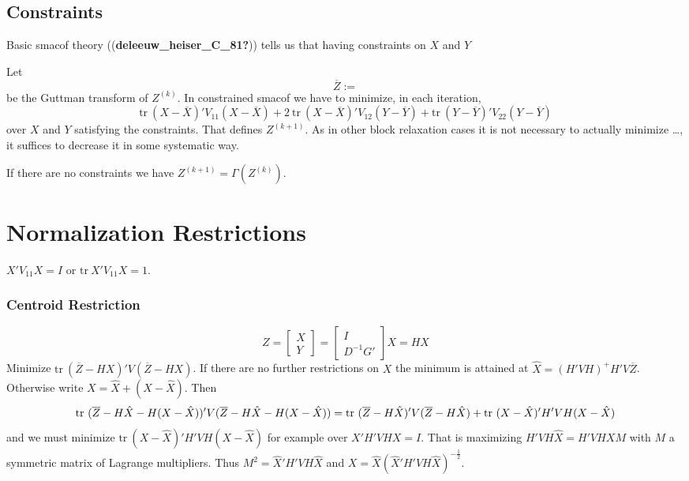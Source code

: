 \documentclass[
  12pt,
]{article}
\begin{document}
\subsection{Constraints}\label{constraints-1}

Basic smacof theory ((\textbf{deleeuw\_heiser\_C\_81?})) tells us that having constraints
on \(X\) and \(Y\)

Let
\begin{equation}
\overline{Z}:=
\label{eq:ufolzdef}
\end{equation}
be the Guttman transform of \(Z^{(k)}\). In constrained smacof we
have to minimize, in each iteration,
\[
\text{tr}\ (X-\overline{X})'V_{11}(X-\overline{X})+
2\ \text{tr}\ (X-\overline{X})'V_{12}(Y-\overline{Y})+
\text{tr}\ (Y-\overline{Y})'V_{22}(Y-\overline{Y})
\]
over \(X\) and \(Y\) satisfying the constraints. That defines \(Z^{(k+1)}\). As in
other block relaxation cases it is not necessary to actually minimize \ldots, it suffices to
decrease it in some systematic way.

If there are no constraints we have \(Z^{(k+1)}=\Gamma(Z^{(k)})\).

\section{Normalization Restrictions}\label{normalization-restrictions}

\(X'V_{11}X=I\) or \(\text{tr}\ X'V_{11}X=1\).

\subsubsection{Centroid Restriction}\label{centroid-restriction}

\[
Z=\begin{bmatrix}
X\\Y
\end{bmatrix}=
\begin{bmatrix}
I\\
D^{-1}G'
\end{bmatrix}X=HX
\]
Minimize \(\text{tr}\ (\overline{Z}-HX)'V(\overline{Z}-HX)\). If there are
no further restrictions on \(X\) the minimum is attained at \(\hat X=(H'VH)^+H'V\overline{Z}\).
Otherwise write \(X=\hat X+(X-\hat X)\). Then
\[
\text{tr}\ (\overline{Z}-H\hat X-H(X-\hat X))'V(\overline{Z}-H\hat X-H(X-\hat X))=\\
\text{tr}\ (\overline{Z}-H\hat X)'V(\overline{Z}-H\hat X)+
\text{tr}\ (X-\hat X)'H'VH(X-\hat X)
\]
and we must minimize \(\text{tr}\ (X-\hat X)'H'VH(X-\hat X)\) for example over \(X'H'VHX=I\).
That is maximizing \(H'VH\hat X=H'VHXM\) with \(M\) a symmetric matrix of Lagrange multipliers.
Thus \(M^2=\hat X'H'VH\hat X\) and \(X=\hat X(\hat X'H'VH\hat X)^{-\frac12}\).
\end{document}

